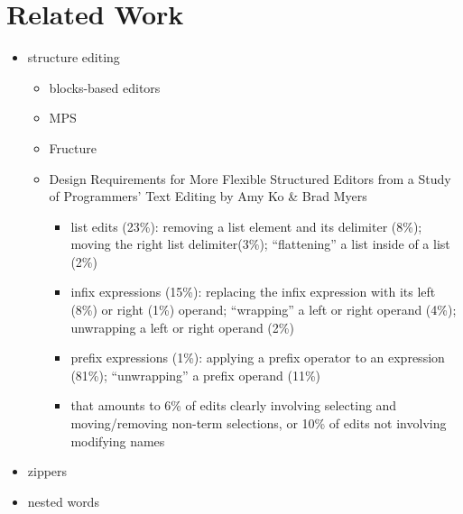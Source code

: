 \section{Related Work}\label{sec:related-work}



\begin{itemize}
  \item structure editing
  \begin{itemize}
    \item blocks-based editors
    \item MPS
    \item Fructure
    \item Design Requirements for More Flexible Structured Editors from a Study of Programmers' Text Editing
      by Amy Ko \& Brad Myers
    \begin{itemize}
        \item list edits (23\%):
          removing a list element and its delimiter (8\%);
          moving the right list delimiter(3\%);
          ``flattening'' a list inside of a list (2\%)
        \item infix expressions (15\%):
            replacing the infix expression with its left (8\%) or right (1\%) operand;
            ``wrapping'' a left or right operand (4\%);
            unwrapping a left or right operand (2\%)
        \item prefix expressions (1\%):
            applying a prefix operator to an expression (81\%);
            ``unwrapping'' a prefix operand (11\%)
        \item that amounts to 6\% of edits clearly involving selecting and
          moving/removing non-term selections, or 10\% of edits not involving
          modifying names
    \end{itemize}
  \end{itemize}
  \item zippers
  \item nested words
\end{itemize}